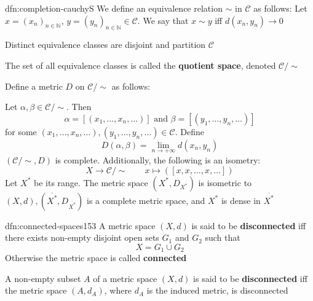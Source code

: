 \documentclass[landscape, 8pt]{extarticle}
\begin{document}
\begin{multicols}{3}
\begin{dfn}{dfn:completion-cauchy}{S}
    We define an equivalence relation $\sim$ in $\mathcal{C}$ as follows: Let $x = (x_{n})_{n\in \mathbb{N}}$, $y=(y_{n})_{n\in \mathbb{N}}\in \mathcal{C}$. We say that $x \sim y$ iff $d(x_{n}, y_{n})\to 0$

    Distinct equivalence classes are disjoint and partition $\mathcal{C}$

    The set of all equivalence classes is called the \textbf{quotient space}, denoted $\mathcal{C} / \sim$
    
    \longrule{0.08ex}
    Define a metric $D$ on $\mathcal{C} / \sim$ as follows:

    Let $\alpha, \beta\in \mathcal{C} /\sim$. Then 
    \[\alpha = [(x_{1},\dots,x_{n},\dots)] \text{ and } \beta = [(y_{1},\dots,y_{n},\dots)]\]
    for some $(x_{1},\dots,x_{n},\dots), (y_{1},\dots,y_{n},\dots)\in \mathcal{C}$. Define
    \[D(\alpha, \beta) = \lim_{n\to +\infty} d(x_{n}, y_{n})\]
    $(\mathcal{C} / \sim, D)$ is complete. Additionally, the following is an isometry:
    \[X \to \mathcal{C} / \sim \qquad x \mapsto ([x,x,\dots,x,\dots])\]
    Let $X^{*}$ be its range. The metric space $(X^{*}, D_{X^{*}})$ is isometric to $(X, d), (\overline{X^{*}}, D_{\overline{X^{*}}})$ is a complete metric space, and $X^{*}$ is dense in $\overline{X^{*}}$
\end{dfn}

\begin{dfn}{dfn:connected-spaces}{153}
    \vspace{-5pt}
    A metric space $(X, d)$ is said to be \textbf{disconnected} iff there exists non-empty disjoint open sets $G_{1}$ and $G_{2}$ such that
    \[X = G_{1} \cup G_{2}\]
    Otherwise the metric space is called \textbf{connected}

    \vspace{-3pt}
    \longrule{0.08ex}
    A non-empty subset $A$ of a metric space $(X, d)$ is said to be \newline\textbf{disconnected} iff the metric space $(A, d_{A})$, where $d_{A}$ is the induced metric, is disconnected
\end{dfn}

\newpage


\end{multicols}
\end{document}
